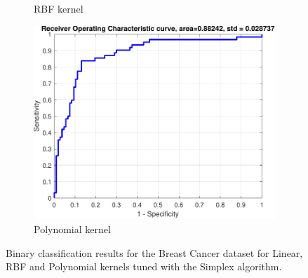 \documentclass{article}
\begin{document}
\begin{figure}[H]
\begin{subfigure}[b]{0.3\textwidth}
                \caption{RBF kernel}
                 \label{fig:breast_rbf_roc}
             \end{subfigure}
             \hfill
             \begin{subfigure}[b]{0.3\textwidth}
                 \centering
                 \includegraphics[width=\textwidth]{Assignment 1/figures/breast_polynomial_classifier_roc.pdf}
                \caption{Polynomial kernel}
                 \label{fig:breast_poly_roc}
             \end{subfigure}
            \caption{Binary classification results for the Breast Cancer dataset for Linear, RBF and Polynomial kernels tuned with the Simplex algorithm.}
            \label{fig:breast_cancer_overall}
        \end{figure}
        
\end{document}
